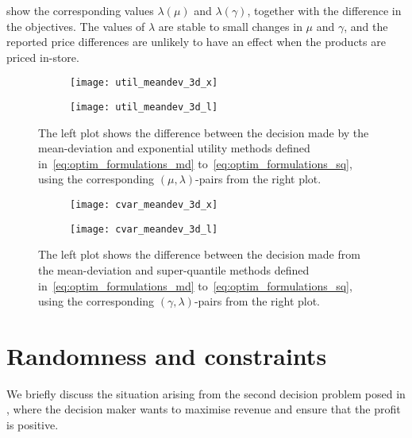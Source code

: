\documentclass[main.tex]{subfiles}
\begin{document}
\begin{example}
   show the
  corresponding values $\lambda(\mu)$ and $\lambda(\gamma)$, together
  with the difference in the objectives. The values of $\lambda$
  are stable to small changes in $\mu$ and $\gamma$, and the
  reported price differences are unlikely to have an effect when
  the products are priced in-store.
  \begin{figure}[htbp]
    \centering
    \begin{subfigure}[t]{.5\textwidth}
      \texttt{[image: util\_meandev\_3d\_x]}
    \end{subfigure}%
    \begin{subfigure}[t]{.5\textwidth}
      \texttt{[image: util\_meandev\_3d\_l]}
    \end{subfigure}
    \caption[Comparison between two decision maker models]{The left plot shows the difference between the decision made
      by the mean-deviation and exponential utility methods defined
      in~\eqref{eq:optim_formulations_md} to~\eqref{eq:optim_formulations_sq}, using the corresponding
      $(\mu,\lambda)$-pairs from the right plot.
    }\label{fig:util_meandev_2d}
  \end{figure}

  \begin{figure}[hbtp]
    \centering
    \begin{subfigure}[t]{.5\textwidth}
      \texttt{[image: cvar\_meandev\_3d\_x]}
    \end{subfigure}%
    \begin{subfigure}[t]{.5\textwidth}
      \texttt{[image: cvar\_meandev\_3d\_l]}
    \end{subfigure}
    \caption[Comparison between two decision maker models]{The left plot shows the difference between the decision made
      from the mean-deviation and super-quantile methods defined
      in~\eqref{eq:optim_formulations_md} to~\eqref{eq:optim_formulations_sq}, using the corresponding
      $(\gamma,\lambda)$-pairs from the right plot.
    }\label{fig:cvar_meandev_2d}
  \end{figure}
\end{example}




\section{Randomness and
  constraints}\label{sec:one_randomness_constraints}
We briefly discuss the situation arising from the
second decision problem posed in ,
where the decision maker wants to maximise revenue and ensure that
the profit is positive.
\end{document}
